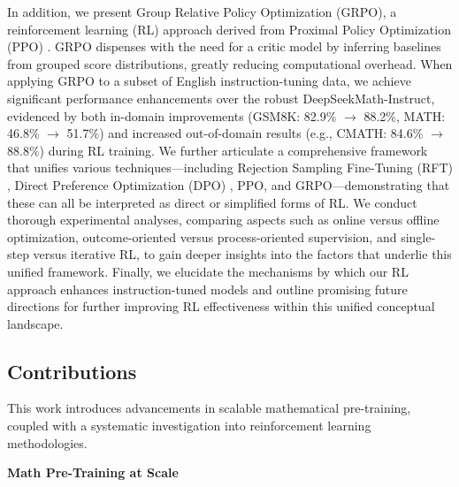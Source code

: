 In addition, we present Group Relative Policy Optimization (GRPO), a reinforcement learning (RL) approach derived from Proximal Policy Optimization (PPO) \citep{schulman2017proximal}. GRPO dispenses with the need for a critic model by inferring baselines from grouped score distributions, greatly reducing computational overhead. When applying GRPO to a subset of English instruction-tuning data, we achieve significant performance enhancements over the robust DeepSeekMath-Instruct, evidenced by both in-domain improvements (GSM8K: 82.9\% $\rightarrow$ 88.2\%, MATH: 46.8\% $\rightarrow$ 51.7\%) and increased out-of-domain results (e.g., CMATH: 84.6\% $\rightarrow$ 88.8\%) during RL training. We further articulate a comprehensive framework that unifies various techniques—including Rejection Sampling Fine-Tuning (RFT) \citep{yuan2023scaling}, Direct Preference Optimization (DPO) \citep{dpo}, PPO, and GRPO—demonstrating that these can all be interpreted as direct or simplified forms of RL. We conduct thorough experimental analyses, comparing aspects such as online versus offline optimization, outcome-oriented versus process-oriented supervision, and single-step versus iterative RL, to gain deeper insights into the factors that underlie this unified framework. Finally, we elucidate the mechanisms by which our RL approach enhances instruction-tuned models and outline promising future directions for further improving RL effectiveness within this unified conceptual landscape.

\subsection{Contributions}
This work introduces advancements in scalable mathematical pre-training, coupled with a systematic investigation into reinforcement learning methodologies.

\textbf{Math Pre-Training at Scale}


